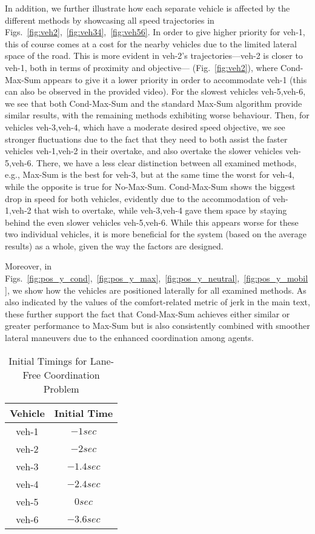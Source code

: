 In addition, we further illustrate how each separate vehicle is affected by the different methods by showcasing all speed trajectories in Figs.~\ref{fig:veh2},~\ref{fig:veh34},~\ref{fig:veh56}.
In order to give higher priority for veh-1, this of course comes at a cost for the nearby vehicles due to the limited lateral space of the road.
This is more evident in veh-2's trajectories---veh-2 is closer to veh-1, both in terms of proximity and objective--- (Fig.~\ref{fig:veh2}), where Cond-Max-Sum appears to give it a lower priority in order to accommodate veh-1 (this can also be observed in the provided video). 
For the slowest vehicles veh-5,veh-6, we see that both Cond-Max-Sum and the standard Max-Sum algorithm provide similar results, with the remaining methods exhibiting worse behaviour.
Then, for vehicles veh-3,veh-4, which have a moderate desired speed objective, we see stronger fluctuations due to the fact that they need to both assist the faster vehicles veh-1,veh-2 in their overtake, and also overtake the slower vehicles veh-5,veh-6. 
There, we have a less clear distinction between all examined methods, e.g., Max-Sum is the best for veh-3, but at the same time the worst for veh-4, while the opposite is true for No-Max-Sum.
Cond-Max-Sum shows the biggest drop in speed for both vehicles, evidently due to the accommodation of veh-1,veh-2 that wish to overtake, while veh-3,veh-4 gave them space by staying behind the even slower vehicles veh-5,veh-6.
While this appears worse for these two individual vehicles,
it is more beneficial for the system (based on the average results) as a whole, given the way the factors are designed.

Moreover, in Figs.~\ref{fig:pos_y_cond},~\ref{fig:pos_y_max},~\ref{fig:pos_y_neutral},~\ref{fig:pos_y_mobil}, we show how the vehicles are positioned laterally for all examined methods. As also indicated by the values of the comfort-related metric of jerk in the main text, these further support the fact that Cond-Max-Sum achieves either similar or greater performance to Max-Sum but is also consistently combined with smoother lateral maneuvers due to the enhanced coordination among agents.


\begin{table}[ht]
  \centering
  
  \caption{Initial Timings for Lane-Free Coordination Problem}
  {
  \begin{tabular}{|c|c|}
  
  \hline
     Vehicle & Initial Time \\ \hline \hline
    veh-1 & $-1 sec$ \\ \hline
    veh-2 & $-2 sec$ \\ \hline
    veh-3 & $-1.4 sec$ \\ \hline
    veh-4 & $-2.4 sec$ \\ \hline
    veh-5 & $0 sec$ \\ \hline
    veh-6 & $-3.6 sec$ \\ \hline
  \end{tabular}
  }
  \label{tab:init_time}  
\end{table}


